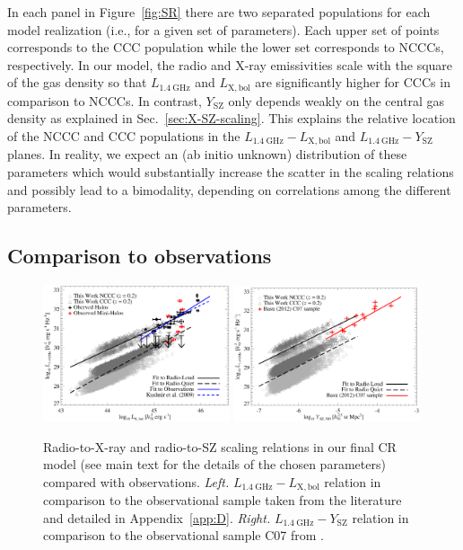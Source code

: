 \documentclass[traditabstract]{aa}
\newcommand{\rmn}{\mathrm}
\begin{document}
In each panel in Figure~\ref{fig:SR} there are two separated populations for
each model realization (i.e., for a given set of parameters). Each upper set of
points corresponds to the CCC population while the lower set corresponds to
NCCCs, respectively. In our model, the radio and X-ray emissivities scale with
the square of the gas density so that $L_{1.4~\rmn{GHz}}$ and $L_{\rmn{X,bol}}$
are significantly higher for CCCs in comparison to NCCCs. In contrast,
$Y_{\rmn{SZ}}$ only depends weakly on the central gas density as explained in
Sec.~\ref{sec:X-SZ-scaling}. This explains the relative location of the NCCC and
CCC populations in the $L_{1.4~\rmn{GHz}}-L_{\rmn{X,bol}}$ and
$L_{1.4~\rmn{GHz}}-Y_{\rmn{SZ}}$ planes. In reality, we expect an (ab initio
unknown) distribution of these parameters which would substantially increase the
scatter in the scaling relations and possibly lead to a bimodality, depending on
correlations among the different parameters.


\subsection{Comparison to observations}
\label{sec:scaling-obs}

\begin{figure}[t]
\centering
\includegraphics[width=0.49\textwidth]{figures/PL_relation.eps}
\includegraphics[width=0.49\textwidth]{figures/PSZ_relation.eps}
\caption{Radio-to-X-ray and radio-to-SZ scaling relations in our final CR model
  (see main text for the details of the chosen parameters) compared with
  observations.  \emph{Left.} $L_{1.4~\rmn{GHz}}-L_{\rmn{X,bol}}$ relation in
  comparison to the observational sample taken from the literature and detailed
  in Appendix~\ref{app:D}. \emph{Right.} $L_{1.4~\rmn{GHz}}-Y_{\rmn{SZ}}$
  relation in comparison to the observational sample C07 from
  \cite{2012MNRAS.421L.112B}.}
\label{fig:PLSZ}
\end{figure} 
 
\end{document}
